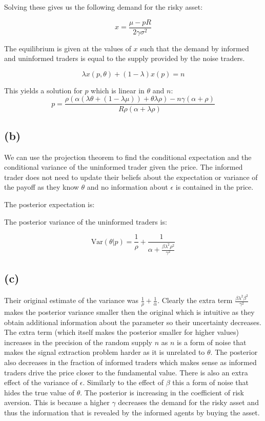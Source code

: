 \documentclass{article}
\begin{document}
Solving these gives us the following demand for the risky asset:

\begin{equation}
x = \frac{\mu-pR}{2\gamma \sigma^2}
\end{equation}

The equilibrium is given at the values of $x$ such that the demand by informed and uninformed traders is equal to the supply provided by the noise traders.

\begin{equation}
\lambda x(p,\theta) + (1- \lambda) x(p) = n
\end{equation}

This yields a solution for $p$ which is linear in $\theta$ and $n$:
\begin{equation}
p=\frac{\rho(\alpha(\lambda \theta + (1-\lambda \mu)) + \theta \lambda \rho)-n \gamma (\alpha+ \rho)}{R \rho (\alpha+\lambda \rho)}
\end{equation}


\subsection{(b)}

We can use the projection theorem to find the conditional expectation and the conditional variance of the uninformed trader given the price. The informed trader does not need to update their beliefs about the expectation or variance of the payoff as they know $\theta$ and no information about $\epsilon$ is contained in the price.

The posterior expectation is:

The posterior variance of the uninformed traders is:

\begin{equation}
\mathrm{Var}(\theta \vert p) = \frac{1}{\rho} + \frac{1}{\alpha+\frac{\beta \lambda^2 \rho^2}{\gamma^2}}
\end{equation}

\subsection{(c)}

Their original estimate of the variance was $\frac{1}{\rho}+\frac{1}{\alpha}$. Clearly the extra term $\frac{\beta \lambda^2 \beta^2}{\gamma^2}$  makes the posterior variance smaller then the original which is intuitive as they obtain additional information about the parameter so their uncertainty decreases. The extra term (which itself makes the posterior smaller for higher values) increases in the precision of the random supply $n$ as $n$ is a form of noise that makes the signal extraction problem harder as it is unrelated to $\theta$. The posterior also decreases in the fraction of informed traders which makes sense as informed traders drive the price closer to the fundamental value. There is also an extra effect of the variance of $\epsilon$. Similarly to the effect of $\beta$ this a form of noise that hides the true value of $\theta$. The posterior is increasing in the coefficient of risk aversion. This is because a higher $\gamma$ decreases the demand for the risky asset and thus the information that is revealed by the informed agents by buying the asset.
\end{document}
